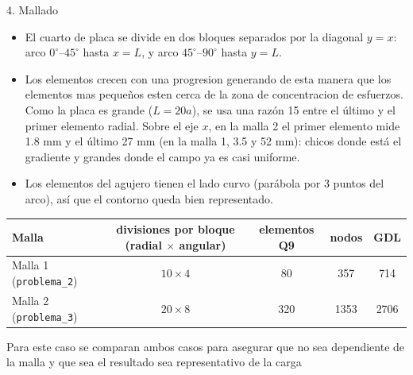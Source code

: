 \begin{desarrollo}{4. Mallado}

\begin{itemize}[itemsep=2pt]
  \item El cuarto de placa se divide en dos bloques separados por la diagonal
  $y=x$: arco $0^\circ$--$45^\circ$ hasta $x=L$, y arco $45^\circ$--$90^\circ$
  hasta $y=L$.
  \item Los elementos crecen con una progresion generando de esta manera que los elementos mas pequeños esten cerca de la zona de concentracion de esfuerzos.
  Como la placa es grande ($L=20a$), se usa una raz\'on 15 entre el \'ultimo y
  el primer elemento radial. Sobre el eje $x$, en la malla 2 el primer elemento
  mide 1.8 mm y el \'ultimo 27 mm (en la malla 1, 3.5 y 52 mm): chicos donde
  est\'a el gradiente y grandes donde el campo ya es casi uniforme.
  \item Los elementos del agujero tienen el lado curvo (par\'abola por 3 puntos
  del arco), as\'i que el contorno queda bien representado.
\end{itemize}

\begin{center}
\renewcommand{\arraystretch}{1.2}
\begin{tabular}{@{}lcccc@{}}
\toprule
Malla & \shortstack{divisiones por bloque\\(radial $\times$ angular)} & elementos Q9 & nodos & GDL\\
\midrule
Malla 1 (\texttt{problema\_2}) & $10\times4$ & 80 & 357 & 714\\
Malla 2 (\texttt{problema\_3}) & $20\times8$ & 320 & 1353 & 2706\\
\bottomrule
\end{tabular}
\end{center}

\begin{center}
\hfill
{}
\end{center}


Para este caso se comparan ambos casos para asegurar que no sea dependiente de la malla y que sea el resultado sea representativo de la carga

\end{desarrollo}

